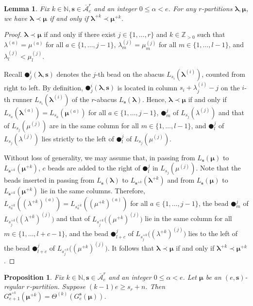 \documentclass[a4paper,10pt]{amsart}
\theoremstyle{plain}
\def\bs{{\boldsymbol{s}}}
\def\N{{\mathbb N}}
\def\blam{{\boldsymbol \lambda}}
\def\bmu{{\boldsymbol \mu}}
\theoremstyle{plain}
\newtheorem{lemma}[theorem]{Lemma}
\newtheorem{proposition}[theorem]{Proposition}
\numberwithin{equation}{section}
\begin{document}
\begin{lemma}\label{5.10}
Fix $k\in\N, \bs\in \overline{\mathcal A}^r_e$ and an integer $0\leq \alpha<e$. For any $r$-partitions $\blam,\bmu$, we have $\blam \prec \bmu$ if and only if $\blam^{+k} \prec \bmu^{+k}$.
\end{lemma}

\begin{proof} $\blam \prec \bmu$ if and only if there exist $j\in \{1,\ldots,r\}$ and $k\in \mathbb{Z}_{>0}$ such that $\lambda^{(a)}=\mu^{(a)}$ for all $a\in \{1,\ldots,j-1\}$, $\lambda^{(j)}_m=\mu^{(j)}_m$ for all $m\in \{1,\ldots,l-1\}$, and $\lambda^{(j)}_l<\mu^{(j)}_l$.

Recall $\CIRCLE_j^i(\blam, \bs)$ denotes the $j$-th bead on the abacus $L_{s_i}(\blam^{(i)})$, counted from right to left. By definition, $\CIRCLE_j^i(\blam, \bs)$ is located in column $s_i+\lambda^{(i)}_j-j$ on the $i$-th runner $L_{s_i}(\blam^{(i)})$ of the $r$-abacus $L_\bs(\blam)$. Hence, $\blam \prec \bmu$ if and only if $L_{s_a}(\blam^{(a)})=L_{s_a}(\bmu^{(a)})$ for all $a\in \{1, \ldots, j-1\}$, $\CIRCLE^j_m$ of $L_{s_j}(\lambda^{(j)})$ and that of $L_{s_j}(\mu^{(j)})$ are in the same column for all $m\in \{1, \ldots, l-1\}$, and $\CIRCLE^j_l$ of $L_{s_j}(\lambda^{(j)})$ lies strictly to the left of $\CIRCLE^j_l$ of $L_{s_j}(\mu^{(j)})$.

Without loss of generality, we may assume that, in passing from $L_\bs(\bmu)$ to $L_{\bs^{+k}}(\bmu^{+k})$, $c$ beads are added to the right of $\CIRCLE^j_l$ in $L_{s_j}(\mu^{(j)})$.
Note that the beads inserted in passing from $L_\bs(\blam)$ to $L_{\bs^{+k}}(\blam^{+k})$ and from $L_\bs(\bmu)$ to $L_{\bs^{+k}}(\bmu^{+k})$ lie in the same columns. Therefore, $L_{s^{+k}_a}((\lambda^{+k})^{(a)})=L_{s^{+k}_a}((\mu^{+k})^{(a)})$ for all $a\in \{1, \ldots, j-1\}$, the bead $\CIRCLE^j_m$ of $L_{s^{+k}_j}\bigl((\lambda^{+k})^{(j)}\bigr)$ and that of $L_{s^{+k}_j}\bigl((\mu^{+k})^{(j)}\bigr)$ lie in the same column for all $m\in \{1, \ldots, l+c-1\}$, and the bead $\CIRCLE^j_{l+c}$ of $L_{s^{+k}_j}\bigl((\lambda^{+k})^{(j)}\bigr)$ lies to the left of the bead $\CIRCLE^j_{l+c}$ of $L_{s^{+k}_j}\bigl((\mu^{+k})^{(j)}\bigr)$. It follows that $\blam \prec \bmu$ if and only if $\blam^{+k} \prec \bmu^{+k}$.
\end{proof}


\begin{proposition}\label{KeyCanonicalBases2}
Fix $k\in\N, \bs\in \overline{\mathcal A}^r_e$ and an integer $0\leq \alpha<e$. Let $\bmu$ be an $(e,\bs)$-regular $r$-partition. Suppose $(k-1)e \ge s_r+n$. Then $G^{\bs^{+k}}_{e+1}(\bmu^{+k})=\varTheta^{(k)}(G^\bs_e(\bmu))$.
\end{proposition}
\end{document}
